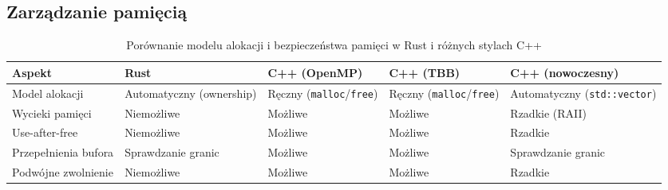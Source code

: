\subsection{Zarządzanie pamięcią}
\begin{table}[H]
    \centering
    \caption{Porównanie modelu alokacji i bezpieczeństwa pamięci w Rust i różnych stylach C++}
    \begin{tabularx}{\textwidth}{lXXXX}
    \toprule
    \textbf{Aspekt} &
    \textbf{Rust} &
    \textbf{C++ (OpenMP)} &
    \textbf{C++ (TBB)} &
    \textbf{C++ (nowoczesny)} \\
    \midrule
    Model alokacji &
    Automatyczny (ownership) &
    Ręczny (\texttt{malloc}/\texttt{free}) &
    Ręczny (\texttt{malloc}/\texttt{free}) &
    Automatyczny (\texttt{std::vector}) \\
    
    Wycieki pamięci &
    Niemożliwe &
    Możliwe &
    Możliwe &
    Rzadkie (RAII) \\
    
    Use-after-free &
    Niemożliwe &
    Możliwe &
    Możliwe &
    Rzadkie \\
    
    Przepełnienia bufora &
    Sprawdzanie granic &
    Możliwe &
    Możliwe &
    Sprawdzanie granic \\
    
    Podwójne zwolnienie &
    Niemożliwe &
    Możliwe &
    Możliwe &
    Rzadkie \\
    \bottomrule
    \end{tabularx}
\end{table}

